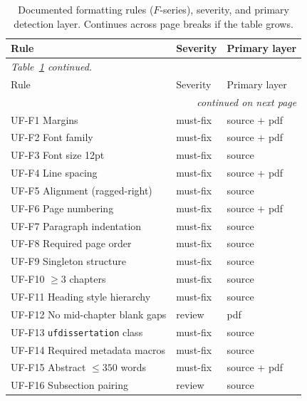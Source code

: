 \begin{longtable}{lll}
\caption{Documented formatting rules ($F$-series), severity, and primary
detection layer. Continues across page breaks if the table grows.}
\label{tab:rules-long} \\
\hline
Rule & Severity & Primary layer \\
\hline
\endfirsthead
\multicolumn{3}{l}{\footnotesize\itshape Table~\ref{tab:rules-long} continued.} \\
\hline
Rule & Severity & Primary layer \\
\hline
\endhead
\hline
\multicolumn{3}{r}{\footnotesize\itshape continued on next page} \\
\endfoot
\hline
\endlastfoot
UF-F1  Margins                  & must-fix & source + pdf \\
UF-F2  Font family              & must-fix & source + pdf \\
UF-F3  Font size 12pt           & must-fix & source \\
UF-F4  Line spacing             & must-fix & source + pdf \\
UF-F5  Alignment (ragged-right) & must-fix & source \\
UF-F6  Page numbering           & must-fix & source + pdf \\
UF-F7  Paragraph indentation    & must-fix & source \\
UF-F8  Required page order      & must-fix & source \\
UF-F9  Singleton structure      & must-fix & source \\
UF-F10 $\geq 3$ chapters        & must-fix & source \\
UF-F11 Heading style hierarchy  & must-fix & source \\
UF-F12 No mid-chapter blank gaps & review  & pdf \\
UF-F13 \texttt{ufdissertation} class & must-fix & source \\
UF-F14 Required metadata macros & must-fix & source \\
UF-F15 Abstract $\leq 350$ words & must-fix & source + pdf \\
UF-F16 Subsection pairing       & review   & source \\
\end{longtable}

